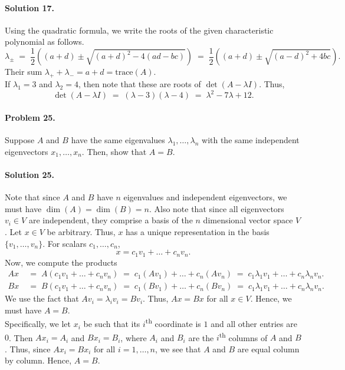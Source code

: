 \documentclass[10pt]{article}
\begin{document}
        \paragraph{Solution 17.}
        Using the quadratic formula, we write the roots of the given characteristic polynomial as follows.
        \[
        \lambda_\pm \;=\; \frac{1}{2}\left((a + d) \pm \sqrt{(a + d)^2 - 4(ad - bc)}\right)
         \;=\; \frac{1}{2}\left((a + d) \pm \sqrt{(a - d)^2 + 4bc}\right).
        \]
        Their sum $\lambda_+ + \lambda_- = a + d = \mathrm{trace}(A)$. \\
        
        If $\lambda_1 = 3$ and $\lambda_2 = 4$, then note that these are roots of $\det(A - \lambda I)$. Thus,
        \[
        \det(A - \lambda I) \;=\; (\lambda - 3)(\lambda - 4) \;=\; \lambda^2 - 7\lambda + 12.
        \]


        \paragraph{Problem 25.}
        Suppose $A$ and $B$ have the same eigenvalues $\lambda_1, \dots, \lambda_n$ with the same independent eigenvectors $x_1, \dots, x_n$.
        Then, show that $A = B$.
        \paragraph{Solution 25.}
        Note that since $A$ and $B$ have $n$ eigenvalues and independent eigenvectors, we must have $\dim(A) = \dim(B) = n$.
        Also note that since all eigenvectors $v_i \in V$ are independent, they comprise a basis of the $n$ dimensional vector space $V$.
        Let $x \in V$ be arbitrary. Thus, $x$ has a unique representation in the basis $\{v_1, \dots, v_n\}$. For scalars
        $c_1,\dots,c_n$,
        \[
        x = c_1v_1 + \dots + c_nv_n.
        \]
        Now, we compute the products
        \begin{align*}
        Ax \;&=\; A(c_1v_1 + \dots + c_nv_n) \;=\; c_1(Av_1) + \dots + c_n(Av_n) \;=\; c_1\lambda_1v_1 + \dots + c_n\lambda_nv_n. \\
        Bx \;&=\; B(c_1v_1 + \dots + c_nv_n) \;=\; c_1(Bv_1) + \dots + c_n(Bv_n) \;=\; c_1\lambda_1v_1 + \dots + c_n\lambda_nv_n.
        \end{align*}
        We use the fact that $Av_i = \lambda_iv_i = Bv_i$. Thus, $Ax = Bx$ for all $x \in V$. Hence, we must have $A = B$. \\
        
        Specifically, we let $x_i$ be such that its $i$\textsuperscript{th} coordinate is $1$ and all other entries are $0$.
        Then $Ax_i = A_i$ and $Bx_i = B_i$, where $A_i$ and $B_i$ are the $i$\textsuperscript{th} columns of $A$ and $B$.
        Thus, since $Ax_i = Bx_i$ for all $i = 1, \dots, n$, we see that $A$ and $B$ are equal column by column. Hence, $A = B$.
        
\end{document}
